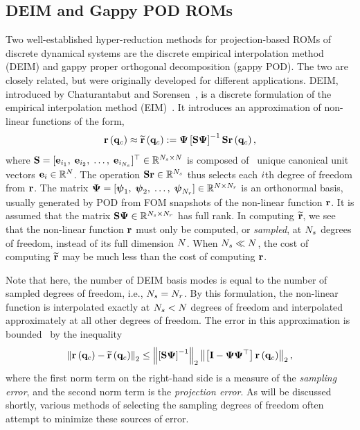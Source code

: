\subsection{DEIM and Gappy POD ROMs}
%
Two well-established hyper-reduction methods for projection-based ROMs of discrete dynamical systems are the discrete empirical interpolation method (DEIM) and gappy proper orthogonal decomposition (gappy POD). The two are closely related, but were originally developed for different applications. DEIM, introduced by Chaturantabut and Sorensen~\cite{Chaturantabut2010}, is a discrete formulation of the empirical interpolation method (EIM)~\cite{Barrault2004}. It introduces an approximation of non-linear functions of the form,
%
\begin{equation}\label{eq:deimRHSApprox}
    \resFunc{\consVec} \approx \resApproxFunc{\consVec} \defEq \deimBasis \left[ \sampMat \deimBasis \right]^{-1} \sampMat \resFunc{\consVec},
\end{equation}
%
where $\mathbf{S} = [\mathbf{e}_{i_1}, \; \mathbf{e}_{i_2}, \; \hdots, \; \mathbf{e}_{i_{N_s}} ]^\top \in \mathbb{R}^{N_s \times N}$ is composed of \numSamps\ unique canonical unit vectors $\mathbf{e}_{i} \in \mathbb{R}^{N}$. The operation $\mathbf{S} \mathbf{r} \in \mathbb{R}^{N_s}$ thus selects each $i$th degree of freedom from $\mathbf{r}$. The matrix $\deimBasis = [\deimBasisVec_1, \; \deimBasisVec_2, \; \hdots, \; \deimBasisVec_{\numResModes}] \inRTwo{\numDOF}{\numResModes}$ is an orthonormal basis, usually generated by POD from FOM snapshots of the non-linear function $\mathbf{r}$. It is assumed that the matrix $\sampMat \deimBasis \inRTwo{\numSamps}{\numResModes}$ has full rank. In computing $\mathbf{\widetilde{r}}$, we see that the non-linear function $\mathbf{r}$ must only be computed, or \textit{sampled}, at $N_s$ degrees of freedom, instead of its full dimension $N$. When $N_s \ll N$, the cost of computing $\mathbf{\widetilde{r}}$ may be much less than the cost of computing $\mathbf{r}$.

Note that here, the number of DEIM basis modes is equal to the number of sampled degrees of freedom, i.e., $N_s = N_r$. By this formulation, the non-linear function is interpolated exactly at $N_s < N$ degrees of freedom and interpolated approximately at all other degrees of freedom. The error in this approximation is bounded~\cite{Chaturantabut2010} by the inequality
%
\begin{equation}\label{eq:deimErrorBound}
   \left\Vert \resFunc{\consVec} - \resApproxFunc{\consVec} \right\Vert_2 \le \left\Vert \left[ \sampMat \deimBasis \right]^{-1} \right\Vert_2 \left\Vert \left[ \identMat - \deimBasis \deimBasis^\top \right] \resFunc{\consVec} \right\Vert_2,
\end{equation}
%
where the first norm term on the right-hand side is a measure of the \textit{sampling error}, and the second norm term is the \textit{projection error}. As will be discussed shortly, various methods of selecting the sampling degrees of freedom often attempt to minimize these sources of error.

